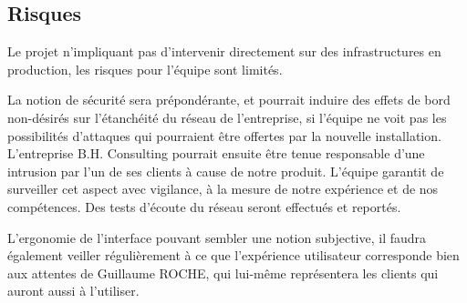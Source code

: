 \subsection{Risques}

Le projet n'impliquant pas d'intervenir directement sur des infrastructures en production, les risques pour l'équipe sont limités.

La notion de sécurité sera prépondérante, et pourrait induire des effets de bord non-désirés sur l'étanchéité du réseau de l'entreprise, si l'équipe ne voit pas les possibilités d'attaques qui pourraient être offertes par la nouvelle installation. L'entreprise B.H. Consulting pourrait ensuite être tenue responsable d'une intrusion par l'un de ses clients à cause de notre produit. L'équipe garantit de surveiller cet aspect avec vigilance, à la mesure de notre expérience et de nos compétences. Des tests d'écoute du réseau seront effectués et reportés.

L'ergonomie de l'interface pouvant sembler une notion subjective, il faudra également veiller régulièrement à ce que l'expérience utilisateur corresponde bien aux attentes de Guillaume ROCHE, qui lui-même représentera les clients qui auront aussi à l'utiliser.


